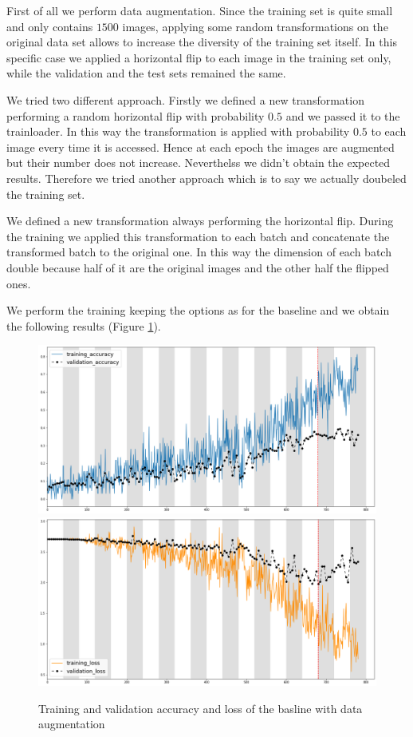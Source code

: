 \documentclass[12pt, a4paper]{report}
\begin{document}
First of all we perform data augmentation. Since the training set is quite small and only contains $1500$ images, applying some random transformations on the original data set allows to increase the diversity of the training set itself. In this specific case we applied a horizontal flip to each image in the training set only, while the validation and the test sets remained the same.

We tried two different approach. Firstly we defined a new transformation performing a random horizontal flip with probability $0.5$ and we passed it to the trainloader. In this way the transformation is applied with probability $0.5$ to each image every time it is accessed. Hence at each epoch the images are augmented but their number does not increase. Neverthelss we didn't obtain the expected results. Therefore we tried another approach which is to say we actually doubeled the training set. 

We defined a new transformation always performing the horizontal flip. During the training we applied this transformation to each batch and concatenate the transformed batch to the original one. In this way the dimension of each batch double because half of it are the original images and the other half the flipped ones.

We perform the training keeping the options as for the baseline and we obtain the following results (Figure \ref{fig:augmented}).

\begin{figure}[h!]
	\centering
	{\includegraphics[width=.49\textwidth]{img/aug_accuracy}}
	{\includegraphics[width=.49\textwidth]{img/aug_loss}}
	\caption{Training and validation accuracy and loss of the basline with data augmentation}
	\label{fig:augmented}
\end{figure}
\end{document}
